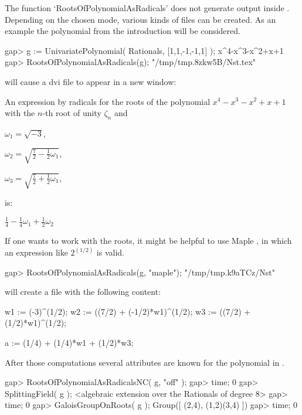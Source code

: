 
The function `RootsOfPolynomialAsRadicals' does not generate output
inside \GAP. Depending on the chosen mode, various kinds
of files can be created. As an example the polynomial from the
introduction will be considered.

\beginexample
gap> g := UnivariatePolynomial( Rationals, [1,1,-1,-1,1] );
x^4-x^3-x^2+x+1
gap> RootsOfPolynomialAsRadicals(g);
"/tmp/tmp.8zkw5B/Nst.tex"
\endexample

will cause a dvi file to appear in a new window:

An expression by radicals for the roots of the polynomial
$x^{4}-x^{3}-x^{2} + x + 1$ with the $n$-th root of unity $\zeta_n$ and

$\omega_1 = \sqrt{ - 3}$,

$\omega_2 = \sqrt{\frac{7}{2} - \frac{1}{2}\omega_1}$,

$\omega_3 = \sqrt{\frac{7}{2} + \frac{1}{2}\omega_1}$,

is:

$\frac{1}{4} - \frac{1}{4}\omega_1 + \frac{1}{2}\omega_2$

If one wants to work with the roots, it might be helpful to use Maple
\cite{Maple10}, in which an expression like $2^{(1/2)}$ is valid.

\beginexample
gap> RootsOfPolynomialAsRadicals(g, "maple");
"/tmp/tmp.k9aTCz/Nst"
\endexample

will create a file with the following content:

\beginexample
w1 := (-3)^(1/2);
w2 := ((7/2) + (-1/2)*w1)^(1/2);
w3 := ((7/2) + (1/2)*w1)^(1/2);

a := (1/4) + (1/4)*w1 + (1/2)*w3;
\endexample

After those computations several attributes are known for the
polynomial in \GAP. 

\beginexample
gap> RootsOfPolynomialAsRadicalsNC( g, "off" );
gap> time;
0
gap> SplittingField( g );
<algebraic extension over the Rationals of degree 8>
gap> time;
0
gap> GaloisGroupOnRoots( g );
Group([ (2,4), (1,2)(3,4) ])
gap> time;
0
\endexample






